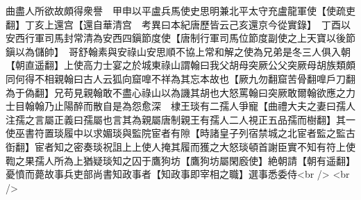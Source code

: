 曲盡人所欲故頗得衆譽　甲申以平盧兵馬使史思明兼北平太守充盧龍軍使【使疏吏翻】丁亥上還宫【還自華清宫　考異曰本紀唐歷皆云己亥還京今從實錄】　丁酉以安西行軍司馬封常清為安西四鎭節度使【唐制行軍司馬位節度副使之上天寶以後節鎭以為儲帥】　哥舒翰素與安祿山安思順不協上常和解之使為兄弟是冬三人俱入朝【朝直遥翻】上使高力士宴之於城東祿山謂翰曰我父胡母突厥公父突厥母胡族類頗同何得不相親翰曰古人云狐向窟嘷不祥為其忘本故也【厥九勿翻窟苦骨翻嘷戶刀翻為于偽翻】兄苟見親翰敢不盡心祿山以為譏其胡也大怒罵翰曰突厥敢爾翰欲應之力士目翰翰乃止陽醉而散自是為怨愈深　棣王琰有二孺人爭寵【曲禮大夫之妻曰孺人注孺之言屬正義曰孺屬也言其為親屬唐制親王有孺人二人視正五品孺而樹翻】其一使巫書符置琰履中以求媚琰與監院宦者有隙【時諸皇子列宿禁城之北宦者監之監古衘翻】宦者知之密奏琰祝詛上上使人掩其履而獲之大怒琰頓首謝臣實不知有符上使鞫之果孺人所為上猶疑琰知之囚于鷹狗坊【鷹狗坊屬閑廏使】絶朝請【朝有遥翻】憂憤而薨故事兵吏部尚書知政事者【知政事即宰相之職】選事悉委侍<br />
<br />
